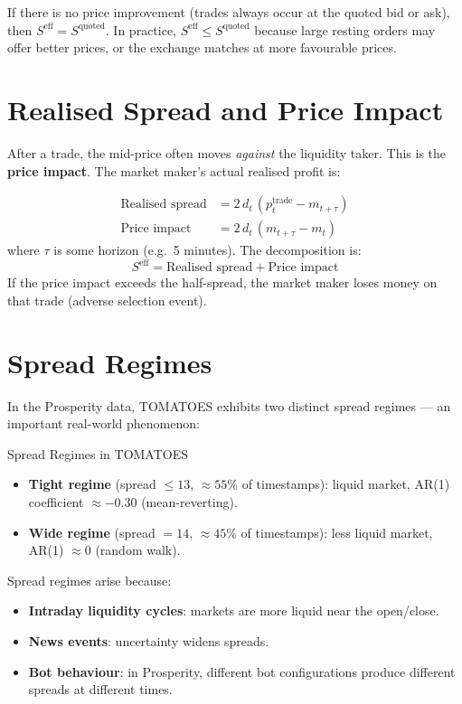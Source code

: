 \documentclass[12pt,a4paper,openany]{report}
\theoremstyle{definition}
\begin{document}
If there is no price improvement (trades always occur at the quoted bid or ask), then $S^{\text{eff}} = S^{\text{quoted}}$. In practice, $S^{\text{eff}} \leq S^{\text{quoted}}$ because large resting orders may offer better prices, or the exchange matches at more favourable prices.

\section{Realised Spread and Price Impact}

After a trade, the mid-price often moves \emph{against} the liquidity taker. This is the \textbf{price impact}. The market maker's actual realised profit is:

\begin{align}
  \text{Realised spread} &= 2 \, d_t \, (p_t^{\text{trade}} - m_{t+\tau}) \\
  \text{Price impact} &= 2 \, d_t \, (m_{t+\tau} - m_t)
\end{align}
where $\tau$ is some horizon (e.g.\ 5 minutes). The decomposition is:
\[
  S^{\text{eff}} = \text{Realised spread} + \text{Price impact}
\]
If the price impact exceeds the half-spread, the market maker loses money on that trade (adverse selection event).

\section{Spread Regimes}

In the Prosperity data, TOMATOES exhibits two distinct spread regimes — an important real-world phenomenon:

\begin{keyconceptbox}{Spread Regimes in TOMATOES}
\begin{itemize}
  \item \textbf{Tight regime} (spread $\leq 13$, $\approx 55\%$ of timestamps): liquid market, AR(1) coefficient $\approx -0.30$ (mean-reverting).
  \item \textbf{Wide regime} (spread $= 14$, $\approx 45\%$ of timestamps): less liquid market, AR(1) $\approx 0$ (random walk).
\end{itemize}
\end{keyconceptbox}

Spread regimes arise because:
\begin{itemize}
  \item \textbf{Intraday liquidity cycles}: markets are more liquid near the open/close.
  \item \textbf{News events}: uncertainty widens spreads.
  \item \textbf{Bot behaviour}: in Prosperity, different bot configurations produce different spreads at different times.
\end{itemize}
\end{document}

